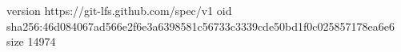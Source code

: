 version https://git-lfs.github.com/spec/v1
oid sha256:46d084067ad566e2f6e3a6398581c56733c3339cde50bd1f0c025857178ea6e6
size 14974
